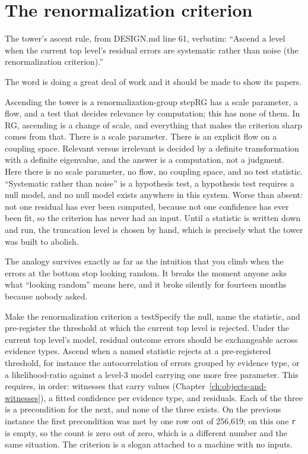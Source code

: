 \section{The renormalization criterion}

The tower's ascent rule, from DESIGN.md line 61, verbatim: ``Ascend a level when the current top level's residual errors are systematic rather than noise (the renormalization criterion).''

The word is doing a great deal of work and it should be made to show its papers.

\begin{Analogy}{Ascending the tower is a renormalization-group step}{RG has a scale parameter, a flow, and a test that decides relevance by computation; this has none of them.}
In RG, ascending is a change of scale, and everything that makes the criterion sharp comes from that. There is a scale parameter. There is an explicit flow on a coupling space. Relevant versus irrelevant is decided by a definite transformation with a definite eigenvalue, and the answer is a computation, not a judgment. Here there is no scale parameter, no flow, no coupling space, and no test statistic. ``Systematic rather than noise'' is a hypothesis test, a hypothesis test requires a null model, and no null model exists anywhere in this system. Worse than absent: not one residual has ever been computed, because not one confidence has ever been fit, so the criterion has never had an input. Until a statistic is written down and run, the truncation level is chosen by hand, which is precisely what the tower was built to abolish.

The analogy survives exactly as far as the intuition that you climb when the errors at the bottom stop looking random. It breaks the moment anyone asks what ``looking random'' means here, and it broke silently for fourteen months because nobody asked.
\end{Analogy}

\begin{Open}{Make the renormalization criterion a test}{Specify the null, name the statistic, and pre-register the threshold at which the current top level is rejected.}
Under the current top level's model, residual outcome errors should be exchangeable across evidence types. Ascend when a named statistic rejects at a pre-registered threshold, for instance the autocorrelation of errors grouped by evidence type, or a likelihood-ratio against a level-3 model carrying one more free parameter. This requires, in order: witnesses that carry values (Chapter~\ref{ch:objects-and-witnesses}), a fitted confidence per evidence type, and residuals. Each of the three is a precondition for the next, and none of the three exists. On the previous instance the first precondition was met by one row out of 256,619; on this one \texttt{r} is empty, so the count is zero out of zero, which is a different number and the same situation. The criterion is a slogan attached to a machine with no inputs.
\end{Open}

